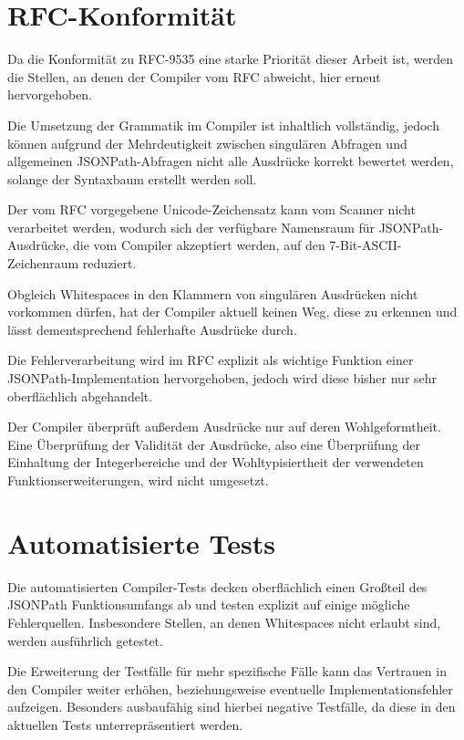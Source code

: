 \documentclass[oneside]{ausarbeitung}
\begin{document}
	\section{RFC-Konformität}
	\label{sect_rfc_konformitaet}
	
	Da die Konformität zu RFC-9535 eine starke Priorität dieser Arbeit ist, werden die Stellen, an denen der Compiler vom RFC abweicht, hier erneut hervorgehoben.
	
	Die Umsetzung der Grammatik im Compiler ist inhaltlich vollständig, jedoch können aufgrund der Mehrdeutigkeit zwischen singulären Abfragen und allgemeinen JSONPath-Abfragen nicht alle Ausdrücke korrekt bewertet werden, solange der Syntaxbaum erstellt werden soll. 
	
	Der vom RFC vorgegebene Unicode-Zeichensatz kann vom Scanner nicht verarbeitet werden, wodurch sich der verfügbare Namensraum für JSONPath-Ausdrücke, die vom Compiler akzeptiert werden, auf den 7-Bit-ASCII-Zeichenraum reduziert.
	
	Obgleich Whitespaces in den Klammern von singulären Ausdrücken nicht vorkommen dürfen, hat der Compiler aktuell keinen Weg, diese zu erkennen und lässt dementsprechend fehlerhafte Ausdrücke durch.
	
	Die Fehlerverarbeitung wird im RFC explizit als wichtige Funktion einer JSONPath-Implementation hervorgehoben, jedoch wird diese bisher nur sehr oberflächlich abgehandelt.
	
\pagebreak

Der Compiler überprüft außerdem Ausdrücke nur auf deren Wohlgeformtheit. Eine Überprüfung der Validität der Ausdrücke, also eine Überprüfung der Einhaltung der Integerbereiche und der Wohltypisiertheit der verwendeten Funktionserweiterungen, wird nicht umgesetzt.
	
	\section{Automatisierte Tests}
	\label{sect_automatisierte_tests}
	
	Die automatisierten Compiler-Tests decken oberflächlich einen Großteil des JSONPath Funktionsumfangs ab und testen explizit auf einige mögliche Fehlerquellen. Insbesondere Stellen, an denen Whitespaces nicht erlaubt sind, werden ausführlich getestet.
	
	Die Erweiterung der Testfälle für mehr spezifische Fälle kann das Vertrauen in den Compiler weiter erhöhen, beziehungsweise eventuelle Implementationsfehler aufzeigen. Besonders ausbaufähig sind hierbei negative Testfälle, da diese in den aktuellen Tests unterrepräsentiert werden. 
	
\end{document}
